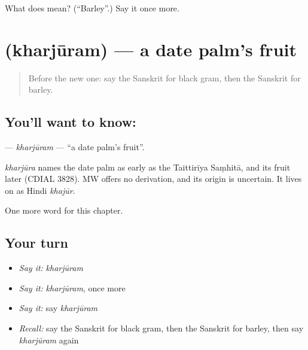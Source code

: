 \begin{tcolorbox}[breakable,colback=teal!4,colframe=teal!35!black,title={Before you move on}]
What does  mean? (\textquotedblleft{}Barley\textquotedblright{}.) Say it once more.
\end{tcolorbox}
\section[\texorpdfstring{\sk{खर्जूरम्} (kharjūram)}{खर्जूरम् (kharjūram)}]{ (kharjūram) — a date palm's fruit}

\label{lesson:SA-C190-kharjuram}



\begin{quote}
Before the new one: say the Sanskrit for black gram, then the Sanskrit for barley.
\end{quote}

\subsection*{You'll want to know: }
\textbf{} — \emph{kharjūram} — \textquotedblleft{}a date palm's fruit\textquotedblright{}.

\begin{cousinweb}
\emph{kharjūra} names the date palm as early as the Taittirīya Saṃhitā, and its fruit later (CDIAL 3828). MW offers no derivation, and its origin is uncertain. It lives on as Hindi \emph{khajūr}.
\end{cousinweb}

\begin{grammarlens}[title={What you've built}]
One more word for this chapter.
\end{grammarlens}

\subsection*{Your turn}
\begin{itemize}
\raggedright
  \item \emph{Say it:} \emph{kharjūram}
  \item \emph{Say it:} \emph{kharjūram}, once more
  \item \emph{Say it:} say \emph{kharjūram}
  \item \emph{Recall:} say the Sanskrit for black gram, then the Sanskrit for barley, then say \emph{kharjūram} again
\end{itemize}

